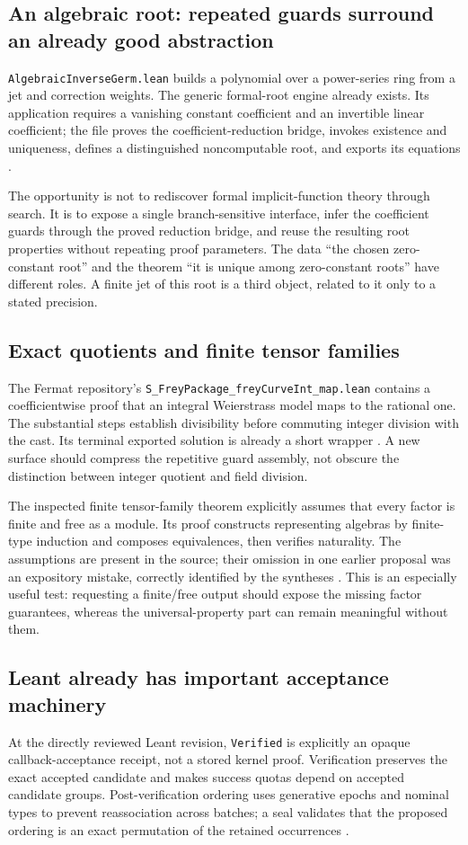 \documentclass[11pt,a4paper]{article}
\newcommand{\code}[1]{\nolinkurl{#1}}
\theoremstyle{plain}
\theoremstyle{definition}
\theoremstyle{remark}
\begin{document}
\subsection{An algebraic root: repeated guards surround an already good abstraction}
\code{AlgebraicInverseGerm.lean} builds a polynomial over a power-series ring from a jet and correction weights. The generic formal-root engine already exists. Its application requires a vanishing constant coefficient and an invertible linear coefficient; the file proves the coefficient-reduction bridge, invokes existence and uniqueness, defines a distinguished noncomputable root, and exports its equations \cite{germ}.

The opportunity is not to rediscover formal implicit-function theory through search. It is to expose a single branch-sensitive interface, infer the coefficient guards through the proved reduction bridge, and reuse the resulting root properties without repeating proof parameters. The data ``the chosen zero-constant root'' and the theorem ``it is unique among zero-constant roots'' have different roles. A finite jet of this root is a third object, related to it only to a stated precision.

\subsection{Exact quotients and finite tensor families}
The Fermat repository's \code{S_FreyPackage_freyCurveInt_map.lean} contains a coefficientwise proof that an integral Weierstrass model maps to the rational one. The substantial steps establish divisibility before commuting integer division with the cast. Its terminal exported solution is already a short wrapper \cite{frey}. A new surface should compress the repetitive guard assembly, not obscure the distinction between integer quotient and field division.

The inspected finite tensor-family theorem explicitly assumes that every factor is finite and free as a module. Its proof constructs representing algebras by finite-type induction and composes equivalences, then verifies naturality. The assumptions are present in the source; their omission in one earlier proposal was an expository mistake, correctly identified by the syntheses \cite{tensor,r3a,r3b}. This is an especially useful test: requesting a finite/free output should expose the missing factor guarantees, whereas the universal-property part can remain meaningful without them.

\subsection{Leant already has important acceptance machinery}
At the directly reviewed Leant revision, \code{Verified} is explicitly an opaque callback-acceptance receipt, not a stored kernel proof. Verification preserves the exact accepted candidate and makes success quotas depend on accepted candidate groups. Post-verification ordering uses generative epochs and nominal types to prevent reassociation across batches; a seal validates that the proposed ordering is an exact permutation of the retained occurrences \cite{verification,postverification}.
\end{document}
